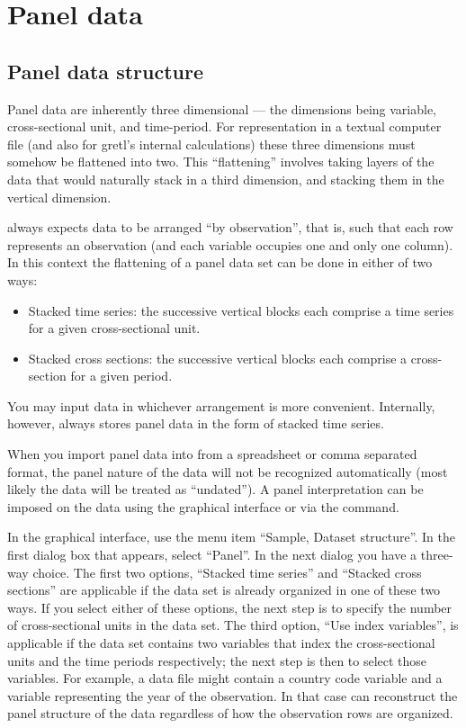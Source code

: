 \chapter{Panel data}
\label{chap-panel}

\section{Panel data structure}
\label{panel-structure}

Panel data are inherently three dimensional --- the dimensions being
variable, cross-sectional unit, and time-period.  For representation
in a textual computer file (and also for gretl's internal
calculations) these three dimensions must somehow be flattened into
two.  This ``flattening'' involves taking layers of the data that
would naturally stack in a third dimension, and stacking them in the
vertical dimension.

 always expects data to be arranged ``by observation'',
that is, such that each row represents an observation (and each
variable occupies one and only one column).  In this context the
flattening of a panel data set can be done in either of two ways:

\begin{itemize}
\item Stacked time series: the successive vertical blocks each
  comprise a time series for a given cross-sectional unit.
\item Stacked cross sections: the successive vertical blocks each
  comprise a cross-section for a given period.
\end{itemize}

You may input data in whichever arrangement is more convenient.
Internally, however,  always stores panel data in
the form of stacked time series.

When you import panel data into  from a spreadsheet or
comma separated format, the panel nature of the data will not be
recognized automatically (most likely the data will be treated as
``undated'').  A panel interpretation can be imposed on the data
using the graphical interface or via the  command.

In the graphical interface, use the menu item ``Sample, Dataset
structure''.  In the first dialog box that appears, select ``Panel''.
In the next dialog you have a three-way choice.  The first two
options, ``Stacked time series'' and ``Stacked cross sections'' are
applicable if the data set is already organized in one of these two
ways.  If you select either of these options, the next step is to
specify the number of cross-sectional units in the data set.  The
third option, ``Use index variables'', is applicable if the data set
contains two variables that index the cross-sectional units and the
time periods respectively; the next step is then to select those
variables.  For example, a data file might contain a country code
variable and a variable representing the year of the observation.  In
that case  can reconstruct the panel structure of the data
regardless of how the observation rows are organized.

